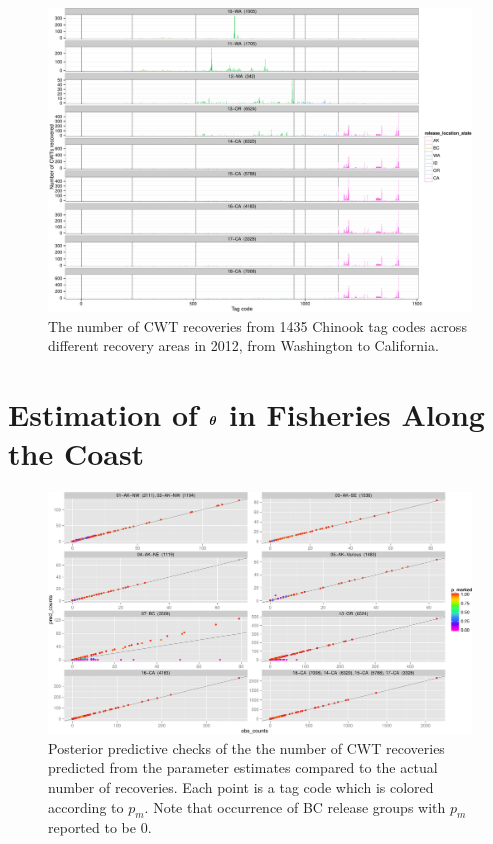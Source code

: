 \documentclass[11pt]{article}
\def\bm#1{\mathpalette\bmstyle{#1}}
\def\bmstyle#1#2{\mbox{\boldmath$#1#2$}}
\newcommand{\btheta}{\bm{\theta}}
\begin{document}
\begin{figure}
\begin{center}
\includegraphics[width=\textwidth]{images/recovery_histo_panel_2.pdf}
\end{center}
\caption{The number of CWT recoveries from 1435 Chinook tag codes across different recovery areas in 2012, from Washington to California.}
\end{figure}


\section{Estimation of $\btheta$ in Fisheries Along the Coast \label{sec:estimation}}

\begin{figure}
\begin{center}
\includegraphics[width=\textwidth]{images/actual_vs_pred_cwt_recoveries_p_marked.pdf}
\end{center}
\caption{Posterior predictive checks of the the number of CWT recoveries predicted from the parameter estimates compared
to the actual number of recoveries.  Each point is a tag code which is colored according to $p_m$.  Note that occurrence
of BC release groups with $p_m$ reported to be 0.}
\end{figure}
\end{document}
